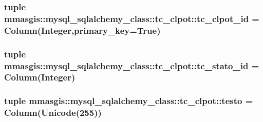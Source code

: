 \hypertarget{classmmasgis_1_1mysql__sqlalchemy__class_1_1tc__clpot_a8da949e994523a4c1eef42085072985f}{
\subsubsection[{tc\_\-clpot\_\-id}]{\setlength{\rightskip}{0pt plus 5cm}tuple {\bf mmasgis::mysql\_\-sqlalchemy\_\-class::tc\_\-clpot::tc\_\-clpot\_\-id} = Column(Integer,primary\_\-key=True)}}
\label{classmmasgis_1_1mysql__sqlalchemy__class_1_1tc__clpot_a8da949e994523a4c1eef42085072985f}
\hypertarget{classmmasgis_1_1mysql__sqlalchemy__class_1_1tc__clpot_a0ace5ee65b7cf896485d6784484eff9a}{
\subsubsection[{tc\_\-stato\_\-id}]{\setlength{\rightskip}{0pt plus 5cm}tuple {\bf mmasgis::mysql\_\-sqlalchemy\_\-class::tc\_\-clpot::tc\_\-stato\_\-id} = Column(Integer)}}
\label{classmmasgis_1_1mysql__sqlalchemy__class_1_1tc__clpot_a0ace5ee65b7cf896485d6784484eff9a}
\hypertarget{classmmasgis_1_1mysql__sqlalchemy__class_1_1tc__clpot_a7a28f1889e0e6d6dd6bd7ec3cbb22da7}{
\subsubsection[{testo}]{\setlength{\rightskip}{0pt plus 5cm}tuple {\bf mmasgis::mysql\_\-sqlalchemy\_\-class::tc\_\-clpot::testo} = Column(Unicode(255))}}
\label{classmmasgis_1_1mysql__sqlalchemy__class_1_1tc__clpot_a7a28f1889e0e6d6dd6bd7ec3cbb22da7}
